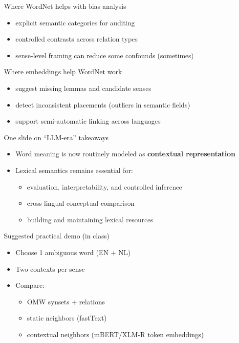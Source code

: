 \documentclass{beamer}
\begin{document}
\begin{frame}{Where WordNet helps with bias analysis}
\begin{itemize}
  \item explicit semantic categories for auditing
  \item controlled contrasts across relation types
  \item sense-level framing can reduce some confounds (sometimes)
\end{itemize}
\end{frame}

\begin{frame}{Where embeddings help WordNet work}
\begin{itemize}
  \item suggest missing lemmas and candidate senses
  \item detect inconsistent placements (outliers in semantic fields)
  \item support semi-automatic linking across languages
\end{itemize}
\end{frame}

\begin{frame}{One slide on ``LLM-era'' takeaways}
\begin{itemize}
  \item Word meaning is now routinely modeled as \textbf{contextual representation}
  \item Lexical semantics remains essential for:
  \begin{itemize}
    \item evaluation, interpretability, and controlled inference
    \item cross-lingual conceptual comparison
    \item building and maintaining lexical resources
  \end{itemize}
\end{itemize}
\end{frame}

\begin{frame}{Suggested practical demo (in class)}
\begin{itemize}
  \item Choose 1 ambiguous word (EN + NL)
  \item Two contexts per sense
  \item Compare:
  \begin{itemize}
    \item OMW synsets + relations
    \item static neighbors (fastText)
    \item contextual neighbors (mBERT/XLM-R token embeddings)
  \end{itemize}
\end{itemize}
\end{frame}
\end{document}

